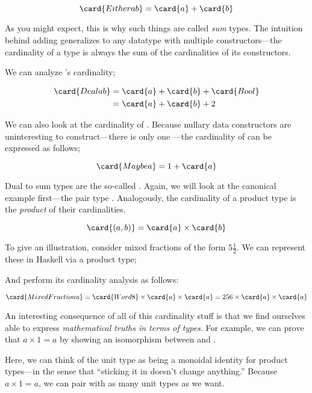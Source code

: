 \documentclass[book.tex]{subfiles}
\begin{document}
$$
\card{Either a b} = \card{a} + \card{b}
$$

As you might expect, this is why such things are called \emph{sum} types. The
intuition behind adding generalizes to any datatype with multiple
constructors---the cardinality of a type is always the sum of the cardinalities
of its constructors.


We can analyze 's cardinality;

$$
\begin{align*}
  \card{Deal a b} &= \card{a} + \card{b} + \card{Bool} \\
  &= \card{a} + \card{b} + 2
\end{align*}
$$

We can also look at the cardinality of . Because nullary data
constructors are uninteresting to construct---there is only one
---the cardinality of  can be expressed as follows;

$$
\card{Maybe a} = 1 + \card{a}
$$

Dual to sum types are the so-called . Again,
we will look at the canonical example first---the pair type .
Analogously, the cardinality of a product type is the \emph{product} of their
cardinalities.

$$
\card{(a, b)} = \card{a} \times \card{b}
$$

To give an illustration, consider mixed fractions of the form $5\frac{1}{2}$. We
can represent these in Haskell via a product type;


And perform its cardinality analysis as follows:

$$
\card{MixedFraction a} = \card{Word8} \times \card{a} \times \card{a} = 256
\times \card{a} \times \card{a}
$$

An interesting consequence of all of this cardinality stuff is that we find
ourselves able to express \emph{mathematical truths in terms of types}. For
example, we can prove that $a \times 1 = a$ by showing an isomorphism between
 and .


Here, we can think of the unit type as being a monoidal identity for product
types---in the sense that ``sticking it in doesn't change anything.'' Because $a
\times 1 = a$, we can pair with as many unit types as we want.
\end{document}
